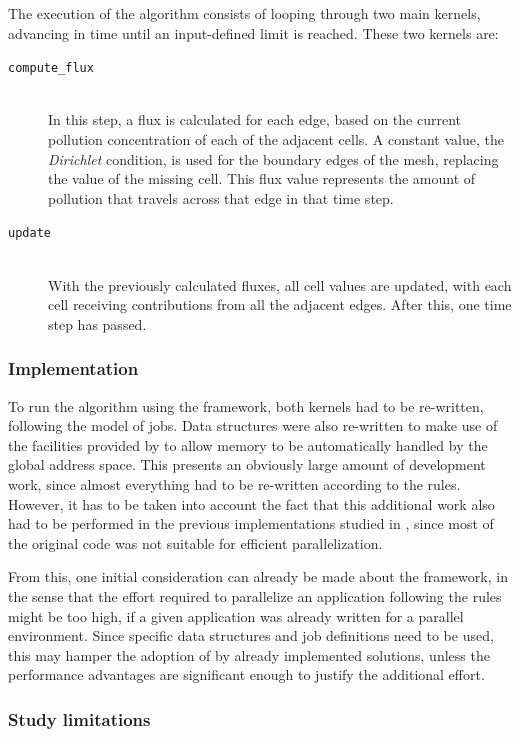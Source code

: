 \documentclass[main.tex]{subfiles}
\begin{document}
The execution of the algorithm consists of looping through two main kernels, advancing in time until an input-defined limit is reached. These two kernels are:
\begin{description}
\item[\texttt{compute\_flux}] \hfill \\
  In this step, a flux is calculated for each edge, based on the current pollution concentration of each of the adjacent cells. A constant value, the \textit{Dirichlet} condition, is used for the boundary edges of the mesh, replacing the value of the missing cell. This flux value represents the amount of pollution that travels across that edge in that time step.

\item[\texttt{update}] \hfill \\
  With the previously calculated fluxes, all cell values are updated, with each cell receiving contributions from all the adjacent edges. After this, one time step has passed.
\end{description}

\subsubsection{Implementation}

To run the algorithm using the framework, both kernels had to be re-written, following the \gama model of jobs. Data structures were also re-written to make use of the facilities provided by \gama to allow memory to be automatically handled by the global address space.
This presents an obviously large amount of development work, since almost everything had to be re-written according to the \gama rules. However, it has to be taken into account the fact that this additional work also had to be performed in the previous implementations studied in \cite{naps2012}, since most of the original code was not suitable for efficient parallelization.

From this, one initial consideration can already be made about the framework, in the sense that the effort required to parallelize an application following the \gama rules might be too high, if a given application was already written for a parallel environment. Since specific data structures and job definitions need to be used, this may hamper the adoption of \gama by already implemented solutions, unless the performance advantages are significant enough to justify the additional effort.

\subsubsection{Study limitations}
\end{document}

